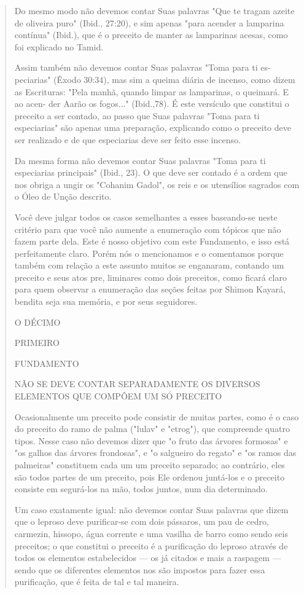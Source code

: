 \begin{quote}
Do mesmo modo não devemos contar Suas palavras "Que te tragam azeite de
oliveira puro" (Ibid., 27:20), e sim apenas "para acender a lamparina
contínua" (Ibid.), que é o preceito de manter as lamparinas acesas, como
foi explicado no Tamid.

Assim também não devemos contar Suas palavras "Toma para ti
es­peciarias" (Êxodo 30:34), mas sim a queima diária de incenso, como
dizem as Escrituras: "Pela manhã, quando limpar as lamparinas, o
queimará. E ao acen-
der Aarão os fogos..." (Ibid.,78). É este versículo que constitui o
preceito a ser contado, ao passo que Suas palavras "Toma para ti
especiarias" são apenas uma preparação, explicando como o preceito deve
ser realizado e de que especia­rias deve ser feito esse incenso.

Da mesma forma não devemos contar Suas palavras "Toma para ti
especiarias principais" (Ibid., 23). O que deve ser contado é a ordem
que nos obriga a ungir os "Cohanim Gadol", os reis e os utensílios
sagrados com o Óleo de Unção descrito.

Você deve julgar todos os casos semelhantes a esses baseando-se neste
critério para que você não aumente a enumeração com tópicos que não
fazem parte dela. Este é nosso objetivo com este Fundamento, e isso está
perfeitamente claro. Porém nós o mencionamos e o comentamos porque
também com rela­ção a este assunto muitos se enganaram, contando um
preceito e seus atos pre­, liminares como dois preceitos, como ficará
claro para quem observar a enume­ração das seções feitas por Shimon
Kayará, bendita seja sua memória, e por seus seguidores.

O DÉCIMO

PRIMEIRO

FUNDAMENTO

NÃO SE DEVE CONTAR SEPARADAMENTE OS DIVERSOS ELEMENTOS QUE COMPÕEM UM SÓ
PRECEITO

Ocasionalmente um preceito pode consistir de muitas partes, como é o
caso do preceito do ramo de palma ("lulav" e "etrog"), que compreende
quatro tipos. Nesse caso não devemos dizer que "o fruto das árvores
formo­sas" e "os galhos das árvores frondosas", e "o salgueiro do
regato" e "os ra­mos das palmeiras" constituem cada um um preceito
separado; ao contrário, eles são todos partes de um preceito, pois Ele
ordenou juntá-los e o preceito consiste em segurá-los na mão, todos
juntos, num dia determinado.

Um caso exatamente igual: não devemos contar Suas palavras que dizem que
o leproso deve purificar-se com dois pássaros, um pau de cedro,
carmezin, hissopo, água corrente e uma vasilha de barro como sendo seis
pre­ceitos; o que constitui o preceito é a purificação do leproso
através de todos os elementos estabelecidos --- os já citados e mais a
raspagem --- sendo que os diferentes elementos nos são impostos para
fazer essa purificação, que é fei­ta de tal e tal maneira.


\end{quote}
